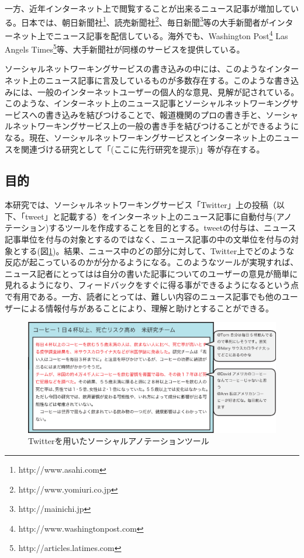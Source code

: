 \documentclass[12pt]{jarticle}
\begin{document}
一方、近年インターネット上で閲覧することが出来るニュース記事が増加している。日本では、朝日新聞社\footnote{http://www.asahi.com}、読売新聞社\footnote{http://www.yomiuri.co.jp}、毎日新聞\footnote{http://mainichi.jp}等の大手新聞者がインターネット上でニュース記事を配信している。海外でも、Washington Post\footnote{http://www.washingtonpost.com} Las Angels Times\footnote{http://articles.latimes.com}等、大手新聞社が同様のサービスを提供している。

ソーシャルネットワーキングサービスの書き込みの中には、このようなインターネット上のニュース記事に言及しているものが多数存在する。このような書き込みには、一般のインターネットユーザーの個人的な意見、見解が記されている。このような、インターネット上のニュース記事とソーシャルネットワーキングサービスへの書き込みを結びつけることで、報道機関のプロの書き手と、ソーシャルネットワーキングサービス上の一般の書き手を結びつけることができるようになる。現在、ソーシャルネットワーキングサービスとインターネット上のニュースを関連づける研究として「(ここに先行研究を提示)」等が存在する。

\subsection{目的}
本研究では、ソーシャルネットワーキングサービス「Twitter」上の投稿（以下、「tweet」と記載する）をインターネット上のニュース記事に自動付与(アノテーション)するツールを作成することを目的とする。tweetの付与は、ニュース記事単位を付与の対象とするのではなく、ニュース記事の中の文単位を付与の対象とする(図\ref{fig1})。結果、ニュース中のどの部分に対して、Twitter上でどのような反応が起こっているのかが分かるようになる。このようなツールが実現すれば、ニュース記者にとってはは自分の書いた記事についてのユーザーの意見が簡単に見れるようになり、フィードバックをすぐに得る事ができるようになるという点で有用である。一方、読者にとっては、難しい内容のニュース記事でも他のユーザーによる情報付与があることにより、理解と助けとすることができる。

\begin{figure}[htbp]
  \begin{center}
    \includegraphics{ai/social_annotation.eps}
  \end{center}
  \caption{Twitterを用いたソーシャルアノテーションツール}
  \label{fig1}
\end{figure}
\end{document}
